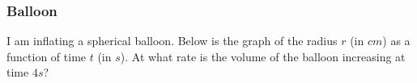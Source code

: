 \documentclass[14pt]{beamer}
\begin{document}

\begin{frame}[t]
\frametitle{Balloon}

I am inflating a spherical balloon.  Below is the graph of the radius $r$ (in $cm$) as a function of time $t$ (in $s$).
 At what rate is the volume of the balloon increasing at time $4s$?

\begin{center}
\end{center}

\end{frame}
\end{document}
